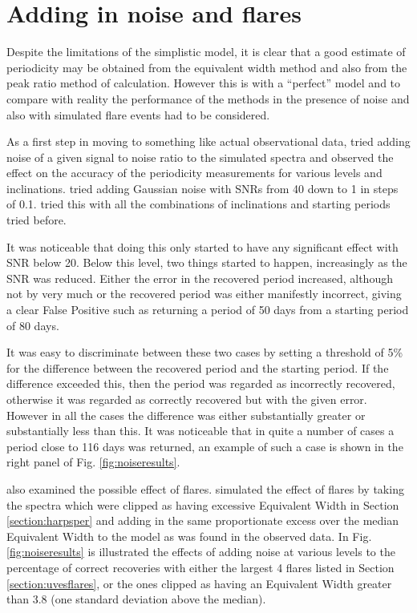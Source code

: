 \section{Adding in noise and flares}
\protect\label{section:addflares}

Despite the limitations of the simplistic model, it is clear that a good estimate of periodicity may be obtained from
the equivalent width method and also from the peak ratio method of calculation. However this is with a ``perfect'' model
and to compare with reality the performance of the methods in the presence of noise and also with simulated flare events
had to be considered.

As a first step in moving to something like actual observational data, {\Firstp} tried adding noise of a given signal to
noise ratio to the simulated spectra and observed the effect on the accuracy of the periodicity measurements for various
levels and inclinations. {\FirstP} tried adding Gaussian noise with SNRs from 40 down to 1 in steps of 0.1.
{\FirstP} tried this with all the combinations of inclinations and starting periods tried before.

It was noticeable that doing this only started to have any significant effect with SNR below 20. Below this level, two
things started to happen, increasingly as the SNR was reduced. Either the error in the recovered period increased,
although not by very much or the recovered period was either manifestly incorrect, giving a clear False Positive such as
returning a period of 50 days from a starting period of 80 days.

It was easy to discriminate between these two cases by setting a threshold of 5\% for the difference between the
recovered period and the starting period. If the difference exceeded this, then the period was regarded as incorrectly
recovered, otherwise it was regarded as correctly recovered but with the given error. However in all the cases the
difference was either substantially greater or substantially less than this. It was noticeable that in quite a number of
cases a period close to 116 days was returned, an example of such a case is shown in the right panel of
Fig. \ref{fig:noiseresults}.

{\FirstP} also examined the possible effect of flares. {\FirstP} simulated the effect of flares by taking the spectra
which were clipped as having excessive Equivalent Width in Section \ref{section:harpsper} and adding in the same
proportionate excess over the median Equivalent Width to the model as was found in the observed data. In
Fig. \ref{fig:noiseresults} is illustrated the effects of adding noise at various levels to the percentage of correct
recoveries with either the largest 4 flares listed in Section \ref{section:uvesflares}, or the ones clipped as having an
Equivalent Width greater than 3.8 (one standard deviation above the median).

